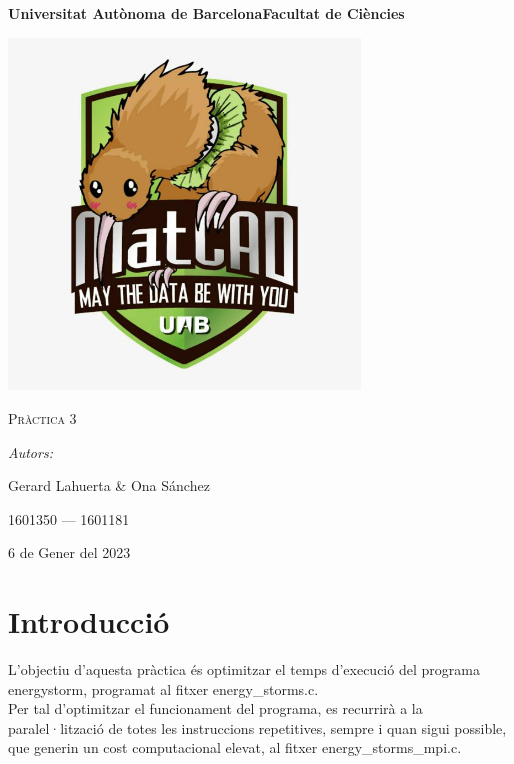 \documentclass[a4paper, 11pt]{article}
\begin{document}
\begin{titlepage}
    \centering
    {\bfseries\LARGE \hspace{1.9em} Universitat Autònoma de Barcelona\newline Facultat de Ciències\par}
    \vspace{2cm}
    {\hspace{-1em}\includegraphics[width=0.7\textwidth]{MatCAD3.jpg}\par}
    \vspace{1cm}
    {\scshape\Huge Pràctica 3\par} 
    \vspace{1cm}
    {\Large \itshape Autors: \par}
    {\Large \hspace{-1.75em} Gerard Lahuerta \& Ona Sánchez \par}
    {\Large 1601350 --- 1601181 \par}
    \vspace{1cm}
    {\Large 6 de Gener del 2023\par}
\end{titlepage}

\justifying

\newpage
\section{Introducció}
L'objectiu d'aquesta pràctica és optimitzar el temps d'execució del programa \textcolor{frenchblue}{energystorm}, programat al fitxer \textcolor{darkpastelgreen}{energy\_storms.c}. \\
Per tal d'optimitzar el funcionament del programa, es recurrirà a la paralel·lització de totes les instruccions repetitives, sempre i quan sigui possible, que generin un cost computacional elevat, al fitxer \textcolor{darkpastelgreen}{energy\_storms\_mpi.c}. \\
\end{document}
